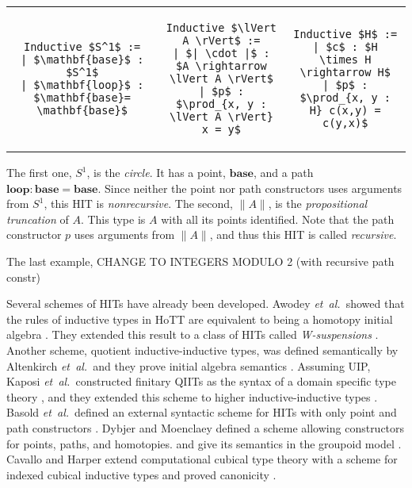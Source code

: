 \documentclass[9pt]{entcs}
\newcommand{\etal}{\emph{et~al.}}
\newcommand{\constructor}[1]{\mathbf{#1}}
\newcommand{\deprod}[3]{\prod_{#1 : #2} #3} %
\newcommand{\0}{\textbf{0}} %
\newcommand{\1}{\textbf{1}} %
\newcommand{\trunct}[1]{\lVert #1 \rVert} %
\newcommand{\truncel}[1]{| #1 |} %
\newcommand{\Circ}{S^1} %
\newcommand{\base}{\constructor{base}} %
\newcommand{\loopS}{\constructor{loop}} %
\begin{document}
\lstset{language=Coq}
\setlength{\tabcolsep}{30pt}	
\begin{tabular}{ c c c }

\begin{lstlisting}[mathescape=true]
Inductive $\Circ$ :=
| $\base$ : $\Circ$
| $\loopS$ : $\base = \base$
\end{lstlisting}
&
\begin{lstlisting}[mathescape=true]
Inductive $\trunct{A}$ :=
| $\truncel{\cdot}$ : $A \rightarrow \trunct{A}$
| $p$ : $\deprod{x, y}{\trunct{A}}{x = y}$
\end{lstlisting}
&
\begin{lstlisting}[mathescape=true]
Inductive $H$ :=
| $c$ : $H \times H \rightarrow H$
| $p$ : $\deprod{x, y}{H}{c(x,y) = c(y,x)}$
\end{lstlisting}
\end{tabular}

The first one, $\Circ$, is the \emph{circle}.
It has a point, $\base$, and a path $\loopS : \base = \base$.
Since neither the point nor path constructors uses arguments from $\Circ$, this HIT is \emph{nonrecursive}.
The second, $\trunct{A}$, is the \emph{propositional truncation} of $A$.
This type is $A$ with all its points identified.
Note that the path constructor $p$ uses arguments from $\trunct{A}$, and thus this HIT is called \emph{recursive}.

The last example, CHANGE TO INTEGERS MODULO 2 (with recursive path constr)

Several schemes of HITs have already been developed.
Awodey \etal \ showed that the rules of inductive types \cite{dybjer1994inductive} in HoTT are equivalent to being a homotopy initial algebra \cite{AwodeyGS12}.
They extended this result to a class of HITs called \emph{W-suspensions} \cite{Sojakova15}.
Another scheme, quotient inductive-inductive types, was defined semantically by Altenkirch \etal \ and they prove initial algebra semantics \cite{AltenkirchCDKF18}.
Assuming UIP, Kaposi \etal \ constructed finitary QIITs as the syntax of a domain specific type theory \cite{KaposiKA19}, and they extended this scheme to higher inductive-inductive types \cite{KaposiK18}.
Basold \etal \ defined an external syntactic scheme for HITs with only point and path constructors \cite{BasoldGW17}.
Dybjer and Moenclaey defined a scheme allowing constructors for points, paths, and homotopies. and give its semantics in the groupoid model  \cite{DybjerM18,HofmannS94}.
Cavallo and Harper extend computational cubical type theory with a scheme for indexed cubical inductive types and proved canonicity \cite{AngiuliHW17,CavalloH19}.
\end{document}
